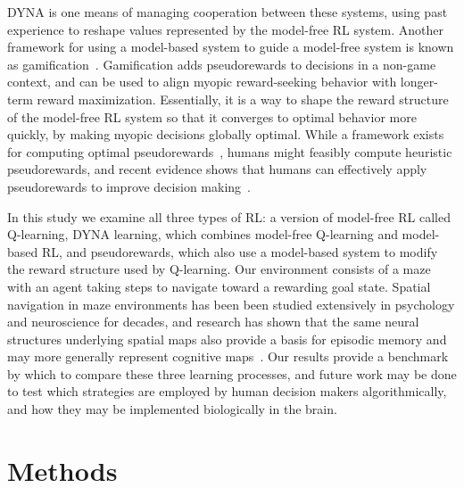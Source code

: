 \documentclass[notitlepage]{article}
\begin{document}
DYNA is one means of managing cooperation between these systems, using past experience to reshape values represented by the model-free RL system. Another framework for using a model-based system to guide a model-free system is known as gamification~\cite{mcgonigal2011reality}. Gamification adds pseudorewards to decisions in a non-game context, and can be used to align myopic reward-seeking behavior with longer-term reward maximization. Essentially, it is a way to shape the reward structure of the model-free RL system so that it converges to optimal behavior more quickly, by making myopic decisions globally optimal. While a framework exists for computing optimal pseudorewards~\cite{ng1999policy}, humans might feasibly compute heuristic pseudorewards, and recent evidence shows that humans can effectively apply pseudorewards to improve decision making~\cite{lieder2016helping}.

In this study we examine all three types of RL: a version of model-free RL called Q-learning, DYNA learning, which combines model-free Q-learning and model-based RL, and pseudorewards, which also use a model-based system to modify the reward structure used by Q-learning. Our environment consists of a maze with an agent taking steps to navigate toward a rewarding goal state. Spatial navigation in maze environments has been been studied extensively in psychology and neuroscience for decades, and research has shown that the same neural structures underlying spatial maps also provide a basis for episodic memory and may more generally represent cognitive maps~\cite{o1978hippocampus}. Our results provide a benchmark by which to compare these three learning processes, and future work may be done to test which strategies are employed by human decision makers algorithmically, and how they may be implemented biologically in the brain.

\section*{Methods}
\end{document}
